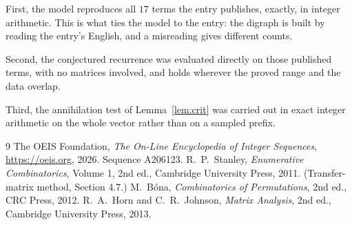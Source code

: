 \documentclass[11pt,a4paper]{article}
\theoremstyle{plain}
\theoremstyle{definition}
\begin{document}
First, the model reproduces all $17$ terms the entry publishes, exactly, in integer
arithmetic. This is what ties the model to the entry: the digraph is built by reading the
entry's English, and a misreading gives different counts.

Second, the conjectured recurrence was evaluated directly on those published terms, with no
matrices involved, and holds wherever the proved range and the data overlap.

Third, the annihilation test of Lemma~\ref{lem:crit} was carried out in exact integer
arithmetic on the whole vector rather than on a sampled prefix.

\begin{thebibliography}{9}
 The OEIS Foundation, \emph{The On-Line Encyclopedia of Integer
Sequences}, \url{https://oeis.org}, 2026. Sequence A206123.
 R.~P.~Stanley, \emph{Enumerative Combinatorics}, Volume 1, 2nd ed.,
Cambridge University Press, 2011. (Transfer-matrix method, Section 4.7.)
 M.~B\'ona, \emph{Combinatorics of Permutations}, 2nd ed., CRC
Press, 2012.
 R.~A.~Horn and C.~R.~Johnson, \emph{Matrix Analysis}, 2nd ed., Cambridge
University Press, 2013.
\end{thebibliography}
\end{document}
